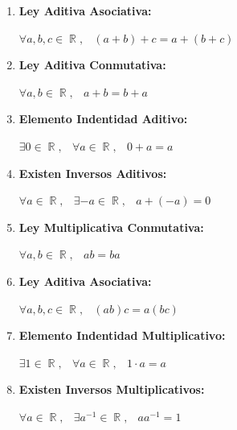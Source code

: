 \documentclass[12pt, fleqn]{report}                             %
\DeclareMathOperator \Space     {\quad}                         %
\DeclareMathOperator \MiniSpace {\;}                            %
\theoremstyle{break}                                            %
\DeclareMathOperator \Reals        {\mathbb{R}}                 %
\begin{document}
        \begin{multicols}{2}
            \begin{enumerate}
                \item 
                    \textbf{Ley Aditiva Asociativa:}

                    $\forall a, b, c \in \Reals, \MiniSpace
                        (a + b) + c = a + (b + c)$

                \item 
                    \textbf{Ley Aditiva Conmutativa:}

                    $\forall a, b \in \Reals, \MiniSpace
                            a + b = b + a$

                \item 
                    \textbf{Elemento Indentidad Aditivo:}

                    $\exists 0 \in \Reals, \MiniSpace
                        \forall a \in \Reals, \MiniSpace 0 + a = a$

                \item 
                    \textbf{Existen Inversos Aditivos:}

                    $\forall a \in \Reals, \MiniSpace
                            \exists -a \in \Reals, \MiniSpace
                                a + (-a) = 0$

                \item 
                    \textbf{Ley Multiplicativa Conmutativa:}

                    $\forall a, b \in \Reals, \MiniSpace
                            ab = ba$

                \item 
                    \textbf{Ley Aditiva Asociativa:}

                    $\forall a, b, c \in \Reals, \MiniSpace
                        (ab)c = a(bc)$

                \item 
                    \textbf{Elemento Indentidad Multiplicativo:}

                    $\exists 1 \in \Reals, \MiniSpace
                        \forall a \in \Reals, \MiniSpace 1 \cdot a = a$

                \item 
                    \textbf{Existen Inversos Multiplicativos:}

                    $\forall a \in \Reals, \MiniSpace
                            \exists a^{-1} \in \Reals, \MiniSpace
                                a a^{-1} = 1$


\end{enumerate}
\end{multicols}
\end{document}
